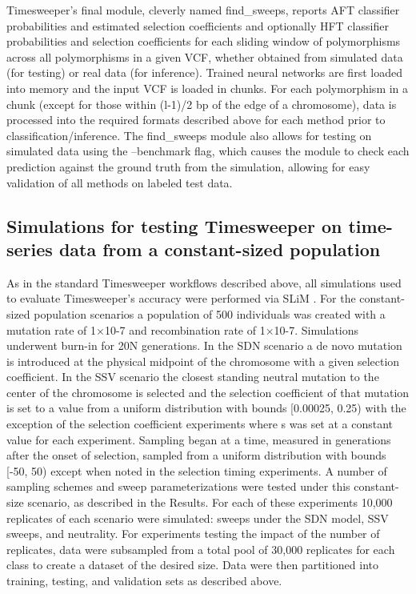 Timesweeper’s final module, cleverly named find\_sweeps, reports AFT classifier probabilities and estimated selection coefficients and optionally HFT classifier probabilities and selection coefficients for each sliding window of polymorphisms across all polymorphisms in a given VCF, whether obtained from simulated data (for testing) or real data (for inference). Trained neural networks are first loaded into memory and the input VCF is loaded in chunks. For each polymorphism in a chunk (except for those within (l-1)/2 bp of the edge of a chromosome), data is processed into the required formats described above for each method prior to classification/inference. The find\_sweeps module also allows for testing on simulated data using the --benchmark flag, which causes the module to check each prediction against the ground truth from the simulation, allowing for easy validation of all methods on labeled test data. \\

\subsection{Simulations for testing Timesweeper on time-series data from a constant-sized population } 

As in the standard Timesweeper workflows described above, all simulations used to evaluate Timesweeper’s accuracy were performed via SLiM \cite{hallerSLiMForwardGenetic2019}. For the constant-sized population scenarios a population of 500 individuals was created with a mutation rate of 1×10-7 and recombination rate of 1×10-7. Simulations underwent burn-in for 20N generations. In the SDN scenario a de novo mutation is introduced at the physical midpoint of the chromosome with a given selection coefficient. In the SSV scenario the closest standing neutral mutation to the center of the chromosome is selected and the selection coefficient of that mutation is set to a value from a uniform distribution with bounds [0.00025, 0.25) with the exception of the selection coefficient experiments where s was set at a constant value for each experiment. Sampling began at a time, measured in generations after the onset of selection, sampled from a uniform distribution with bounds [-50, 50) except when noted in the selection timing experiments. A number of sampling schemes and sweep parameterizations were tested under this constant-size scenario, as described in the Results. For each of these experiments 10,000 replicates of each scenario were simulated: sweeps under the SDN model, SSV sweeps, and neutrality. For experiments testing the impact of the number of replicates, data were subsampled from a total pool of 30,000 replicates for each class to create a dataset of the desired size. Data were then partitioned into training, testing, and validation sets as described above. \\


